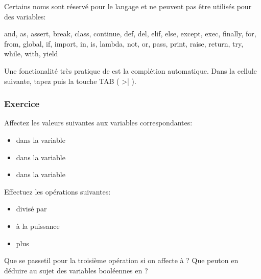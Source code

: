 \documentclass[letterpaper,10pt,english]{sphinxmanual}
\begin{document}
Certains noms sont réservé pour le langage et ne peuvent pas être utilisés pour des variables:

\begin{sphinxVerbatim}[commandchars=\\\{\}]
and, as, assert, break, class, continue, def, del, elif, else, except,
exec, finally, for, from, global, if, import, in, is, lambda, not, or,
pass, print, raise, return, try, while, with, yield
\end{sphinxVerbatim}

Une fonctionalité très pratique de  est la complétion automatique. Dans la cellule suivante, tapez  puis la touche TAB ( \sphinxhyphen{}>| ).


\subsubsection{Exercice}
\label{\detokenize{src/OCI01_Introduction:id2}}
Affectez les valeurs suivantes aux variables correspondantes:
\begin{itemize}
\item {} 
 dans la variable 

\item {} 
 dans la variable 

\item {} 
 dans la variable 

\end{itemize}

Effectuez les opérations suivantes:
\begin{itemize}
\item {} 
 divisé par 

\item {} 
 à la puissance 

\item {} 
 plus 

\end{itemize}

Que se passe\sphinxhyphen{}t\sphinxhyphen{}il pour la troisième opération si on affecte  à  ?
Que peut\sphinxhyphen{}on en déduire au sujet des variables booléennes en  ?
\end{document}
